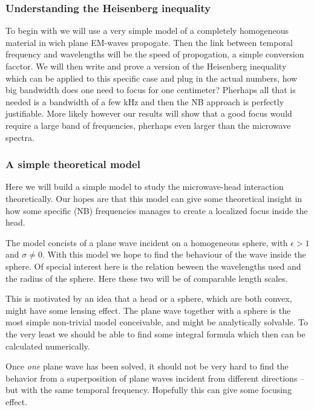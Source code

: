 \documentclass[11pt,a4paper, 
english, swedish %
]{article}
\begin{document}
\subsubsection{Understanding the Heisenberg inequality}

To begin with we will use a very simple model of a completely homogeneous material in wich plane EM-waves propogate. Then the link between temporal frequency and wavelengths will be the speed of propogation, a simple conversion facctor.
We will then write and prove a version of the Heisenberg inequality which can be applied to this specific case and plug in the actual numbers, how big bandwidth does one need to focus for one centimeter? 
Pherhaps all that is needed is a bandwidth of a few kHz and then the NB approach is perfectly justifiable. More likely however our results will show that a good focus would require a large band of frequencies, pherhaps even larger than the microwave spectra. 








\subsubsection{A simple theoretical model} %
Here we will build a simple model to study the microwave-head interaction theoretically. Our hopes are that this model can give some theoretical insight in how some specific (NB) frequencies manages to create a localized focus inside the head. 

The model concists of a plane wave incident on a homogeneous sphere, with $\epsilon>1$ and $\sigma\neq0$. With this model we hope to find the behaviour of the wave inside the sphere. Of special interest here is the relation beween the wavelengths used and the radius of the sphere. Here these two will be of comparable length scales.

This is motivated by an idea that a head or a sphere, which are both convex, might have some lensing effect. The plane wave together with a sphere is the most simple non-trivial model conceivable, and might be analytically solvable. To the very least we should be able to find some integral formula which then can be calculated numerically.

Once \emph{one} plane wave has been solved, it should not be very hard to find the behavior from a superposition of plane waves incident from different directions -- but with the same temporal frequency. Hopefully this can give some focusing effect. 
\end{document}
